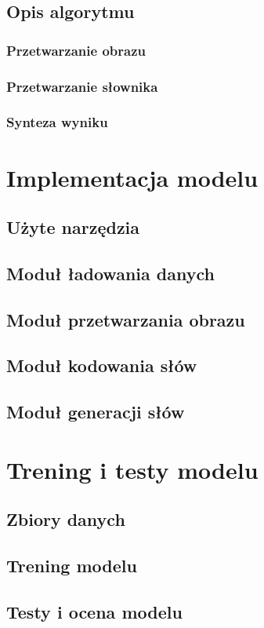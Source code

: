 \subsection{Opis algorytmu}
\subsubsection{Przetwarzanie obrazu}
\subsubsection{Przetwarzanie słownika}
\subsubsection{Synteza wyniku}
\section{Implementacja modelu}
\subsection{Użyte narzędzia}
\subsection{Moduł ładowania danych}
\subsection{Moduł przetwarzania obrazu}
\subsection{Moduł kodowania słów}
\subsection{Moduł generacji słów}
\section{Trening i testy modelu}
\subsection{Zbiory danych}
\subsection{Trening modelu}
\subsection{Testy i ocena modelu}
